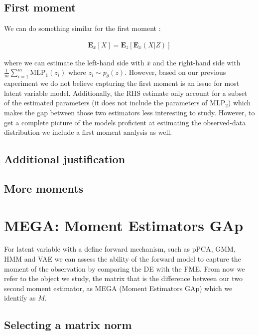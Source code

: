\documentclass{article}
\newcommand{\Ex}{\textbf{E}_x}
\newcommand{\Ez}{\textbf{E}_z}
\begin{document}
{\subsection{First moment}

We can do something similar for the first moment :

\begin{align}
\Ex[X] = \Ez[\Ex(X|Z)] 
\label{1stm}
\end{align}

where we can estimate the left-hand side with $\bar{x}$ and the right-hand side with $\frac{1}{m} \sum_{i=1}^m \text{MLP}_1(z_i)$ where $z_i \sim p_\theta(z)$. However, based on our previous experiment we do not believe capturing the first moment is an issue for most latent variable model. Additionally, the RHS estimate only account for a subset of the estimated parameters (it does not include the parameters of MLP$_2$) which makes the gap between those two estimators less interesting to study. However, to get a complete picture of the models proficient at estimating the observed-data distribution we include a first moment analysis as well.

\subsection{Additional justification} 

\subsection{More moments}

 

\section{MEGA: Moment Estimators GAp} \label{mega}

For latent variable with a define forward mechanism, such as pPCA, GMM, HMM and VAE we can assess the ability of the forward model to capture the moment of the observation by comparing the DE with the FME. From now we refer to the object we study, the matrix that is the difference between our two second moment estimator, as MEGA (Moment Estimators GAp) which we identify as $M$. 

\subsection{Selecting a matrix norm}

}
\end{document}
